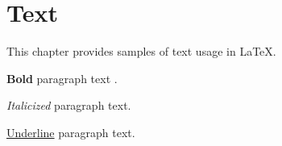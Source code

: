 

\chapter{Text} \label{text}

This chapter provides samples of text usage in LaTeX.

\textbf{Bold} paragraph text .

\textit{Italicized} paragraph text.

\underline{Underline} paragraph text.
